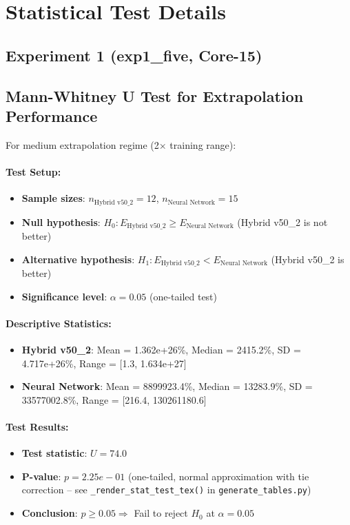 \documentclass[twoside,11pt]{article}
\begin{document}
\section{Statistical Test Details}
\label{app:statistical_tests}

\subsection*{Experiment 1 (exp1\_five, Core-15)}

\subsection{Mann-Whitney U Test for Extrapolation Performance}

For medium extrapolation regime (2$\times$ training range):

\paragraph{Test Setup:}
\begin{itemize}
\item \textbf{Sample sizes}: $n_{\text{Hybrid v50\_2}} = 12$, $n_{\text{Neural Network}} = 15$
\item \textbf{Null hypothesis}: $H_0: E_{\text{Hybrid v50\_2}} \geq E_{\text{Neural Network}}$ (Hybrid v50\_2 is not better)
\item \textbf{Alternative hypothesis}: $H_1: E_{\text{Hybrid v50\_2}} < E_{\text{Neural Network}}$ (Hybrid v50\_2 is better)
\item \textbf{Significance level}: $\alpha = 0.05$ (one-tailed test)
\end{itemize}

\paragraph{Descriptive Statistics:}
\begin{itemize}
\item \textbf{Hybrid v50\_2}: Mean = 1.362e+26\%, Median = 2415.2\%, SD = 4.717e+26\%, Range = [1.3, 1.634e+27]
\item \textbf{Neural Network}: Mean = 8899923.4\%, Median = 13283.9\%, SD = 33577002.8\%, Range = [216.4, 130261180.6]
\end{itemize}

\paragraph{Test Results:}
\begin{itemize}
\item \textbf{Test statistic}: $U = 74.0$
\item \textbf{P-value}: $p = 2.25e-01$ (one-tailed, normal approximation with tie correction -- see \texttt{\_render\_stat\_test\_tex()} in \texttt{generate\_tables.py})
\item \textbf{Conclusion}: $p \geq 0.05 \Rightarrow$ Fail to reject $H_0$ at $\alpha = 0.05$
\end{itemize}
\end{document}
